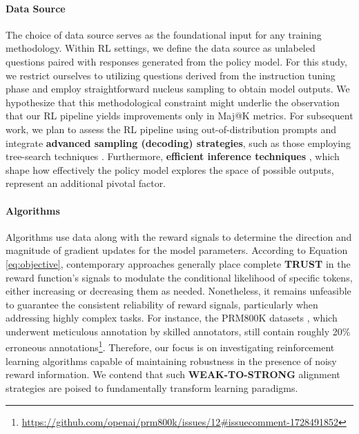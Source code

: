 \begin{itemize}[topsep=0pt]
\begin{itemize}[topsep=0pt]
\paragraph{Data Source} The choice of data source serves as the foundational input for any training methodology. Within RL settings, we define the data source as unlabeled questions paired with responses generated from the policy model. For this study, we restrict ourselves to utilizing questions derived from the instruction tuning phase and employ straightforward nucleus sampling to obtain model outputs. We hypothesize that this methodological constraint might underlie the observation that our RL pipeline yields improvements only in Maj@K metrics. For subsequent work, we plan to assess the RL pipeline using out-of-distribution prompts and integrate \textbf{advanced sampling (decoding) strategies}, such as those employing tree-search techniques \citep{yao2023tree}. Furthermore, \textbf{efficient inference techniques} \citep{xia-etal-2023-speculative,leviathan2023fast,kwon2023efficient,xia2024unlocking}, which shape how effectively the policy model explores the space of possible outputs, represent an additional pivotal factor.

\paragraph{Algorithms} Algorithms use data along with the reward signals to determine the direction and magnitude of gradient updates for the model parameters. According to Equation \ref{eq:objective}, contemporary approaches generally place complete \textbf{TRUST} in the reward function's signals to modulate the conditional likelihood of specific tokens, either increasing or decreasing them as needed. Nonetheless, it remains unfeasible to guarantee the consistent reliability of reward signals, particularly when addressing highly complex tasks. For instance, the PRM800K datasets \citep{lightman2023let}, which underwent meticulous annotation by skilled annotators, still contain roughly 20\% erroneous annotations\footnote{\url{https://github.com/openai/prm800k/issues/12\#issuecomment-1728491852}}. Therefore, our focus is on investigating reinforcement learning algorithms capable of maintaining robustness in the presence of noisy reward information. We contend that such \textbf{WEAK-TO-STRONG} \citep{burns2023weak} alignment strategies are poised to fundamentally transform learning paradigms.


\end{itemize}
\end{itemize}

